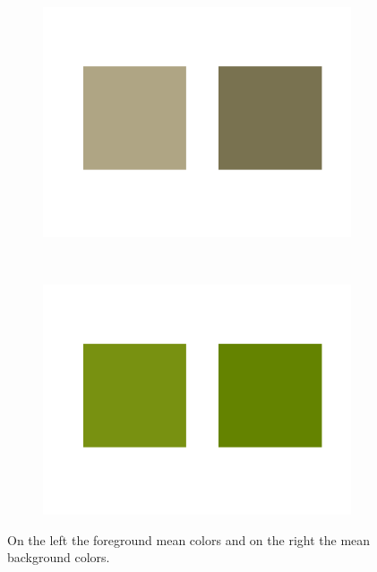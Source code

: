 \documentclass{paper}
\begin{document}
\begin{figure}[H]
    \centering
    \begin{subfigure}{0.45\textwidth}
        \includegraphics[width=\textwidth]{../../outputs/p4/image_segmentation/sheeps/mean_fg}
    \end{subfigure}
    ~
        \begin{subfigure}{0.45\textwidth}
        \includegraphics[width=\textwidth]{../../outputs/p4/image_segmentation/sheeps/mean_bg}
    \end{subfigure}
    
    \caption{On the left the foreground mean colors and on the right the mean background colors.}
    \label{fig:segmentation_sheeps_mean_colors}       
\end{figure}
\end{document}
